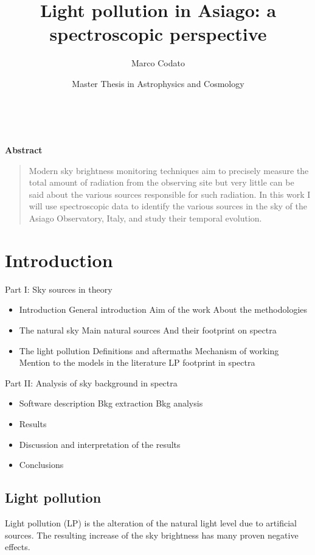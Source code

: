 \documentclass[a4paper, titlepage, 10pt]{book}
\title{Light pollution in Asiago: a spectroscopic perspective}
\author{Marco Codato}
\date{Master Thesis in Astrophysics and Cosmology}
\newenvironment{abstract}{%
	\newpage\thispagestyle{empty}\vspace*{3\baselineskip}
	\begin{center}\Large\textbf{Abstract}\end{center}%
	\begin{quotation}%
	}{\end{quotation}\clearpage}
\begin{document}
\maketitle

\thispagestyle{empty}
\
\begin{abstract}
	Modern sky brightness monitoring techniques aim to precisely measure the total amount of radiation from the observing site but very little can be said about the various sources responsible for such radiation.
	In this work I will use spectroscopic data to identify the various sources in the sky of the Asiago Observatory, Italy, and study their temporal evolution.
\end{abstract}

\clearpage

\tableofcontents

\chapter{Introduction}
Part I: Sky sources in theory
\begin{itemize}
	\item Introduction
		\subitem General introduction
		\subitem Aim of the work
		\subitem About the methodologies
	\item The natural sky
		\subitem Main natural sources
		\subitem And their footprint on spectra
	\item The light pollution
		\subitem Definitions and aftermaths
		\subitem Mechanism of working
		\subitem Mention to the models in the literature
		\subitem LP footprint in spectra
\end{itemize}
Part II: Analysis of sky background in spectra
\begin{itemize}
	\item Software description
		\subitem Bkg extraction
		\subitem Bkg analysis
	\item Results
	\item Discussion and interpretation of the results
	\item Conclusions
\end{itemize}

\section{Light pollution}
Light pollution (LP) is the alteration of the natural light level due to artificial sources. The resulting increase of the sky brightness has many proven negative effects.
\end{document}
